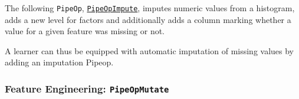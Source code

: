 \documentclass[]{article}
\newenvironment{Shaded}{}{}
\newcommand{\DataTypeTok}[1]{#1}
\newcommand{\KeywordTok}[1]{\textcolor[rgb]{0.00,0.00,1.00}{#1}}
\newcommand{\NormalTok}[1]{#1}
\newcommand{\OperatorTok}[1]{#1}
\newcommand{\StringTok}[1]{\textcolor[rgb]{0.00,0.50,0.50}{#1}}
\renewenvironment{Shaded} {\begin{snugshade}\small} {\end{snugshade}}
\begin{document}
The following \texttt{PipeOp}, \href{https://mlr3pipelines.mlr-org.com/reference/PipeOpImpute.html}{\texttt{PipeOpImpute}}, imputes numeric values from a histogram, adds a new level for factors and additionally adds a column marking whether a value for a given feature was missing or not.

\begin{Shaded}
\end{Shaded}

A learner can thus be equipped with automatic imputation of missing values by adding an imputation Pipeop.

\begin{Shaded}
\end{Shaded}

\hypertarget{feature-engineering-pipeopmutate}{%
\subsubsection{\texorpdfstring{Feature Engineering: \texttt{PipeOpMutate}}{Feature Engineering: PipeOpMutate}}\label{feature-engineering-pipeopmutate}}
\end{document}
